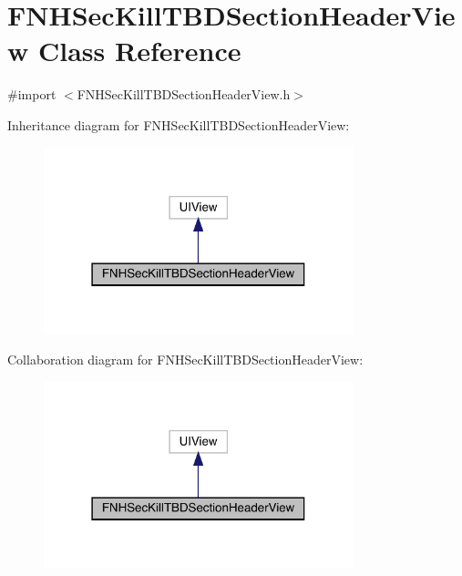 \hypertarget{interface_f_n_h_sec_kill_t_b_d_section_header_view}{}\section{F\+N\+H\+Sec\+Kill\+T\+B\+D\+Section\+Header\+View Class Reference}
\label{interface_f_n_h_sec_kill_t_b_d_section_header_view}


{\ttfamily \#import $<$F\+N\+H\+Sec\+Kill\+T\+B\+D\+Section\+Header\+View.\+h$>$}



Inheritance diagram for F\+N\+H\+Sec\+Kill\+T\+B\+D\+Section\+Header\+View\+:\nopagebreak
\begin{figure}[H]
\begin{center}
\leavevmode
\includegraphics[width=255pt]{interface_f_n_h_sec_kill_t_b_d_section_header_view__inherit__graph}
\end{center}
\end{figure}


Collaboration diagram for F\+N\+H\+Sec\+Kill\+T\+B\+D\+Section\+Header\+View\+:\nopagebreak
\begin{figure}[H]
\begin{center}
\leavevmode
\includegraphics[width=255pt]{interface_f_n_h_sec_kill_t_b_d_section_header_view__coll__graph}
\end{center}
\end{figure}


